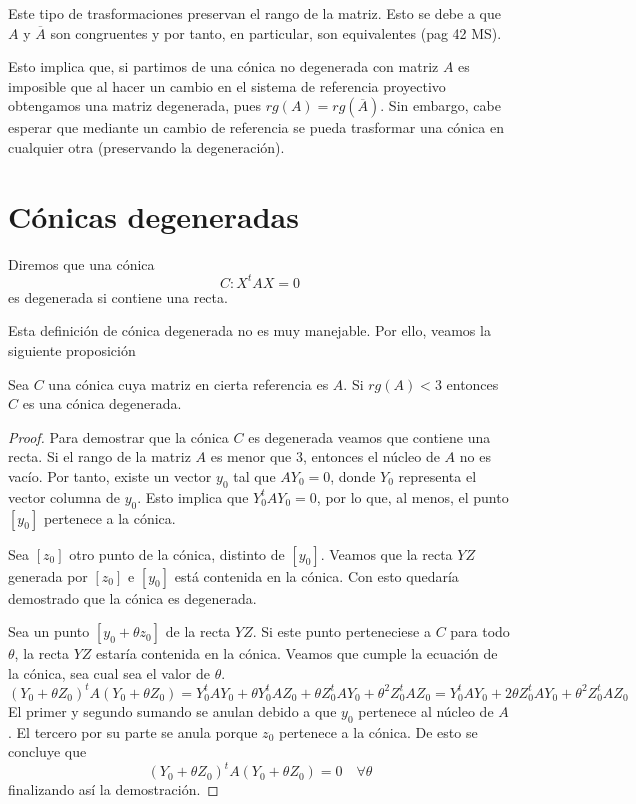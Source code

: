 Este tipo de trasformaciones preservan el rango de la matriz. Esto se debe a que $A$ y $\overline{A}$ son congruentes y por tanto, en particular, son equivalentes (pag 42 MS).

Esto implica que, si partimos de una cónica no degenerada con matriz $A$ es imposible que al hacer un cambio en el sistema de referencia proyectivo obtengamos una matriz degenerada, pues $rg(A)=rg(\overline{A})$. Sin embargo, cabe esperar que mediante un cambio de referencia se pueda trasformar una cónica en cualquier otra (preservando la degeneración).

\section{Cónicas degeneradas}
\begin{defi}
	Diremos que una cónica
	\begin{equation}
	C:X^tAX=0
	\end{equation}
	es degenerada si contiene una recta.
\end{defi}

Esta definición de cónica degenerada no es muy manejable. Por ello, veamos la siguiente proposición
\begin{prop}
	 Sea $C$ una cónica cuya matriz en cierta referencia es $A$. Si $rg(A)<3$ entonces $C$ es una cónica degenerada.
\end{prop}

\begin{proof}
	 Para demostrar que la cónica $C$ es degenerada veamos que contiene una recta. Si el rango de la matriz $A$ es menor que $3$, entonces el núcleo de $A$ no es vacío. Por tanto, existe un vector $y_0$ tal que $AY_0=0$, donde $Y_0$ representa el vector columna de $y_0$. Esto implica que $Y_0^tAY_0=0$, por lo que, al menos, el punto $[y_0]$ pertenece a la cónica.
	 
	 Sea $[z_0]$ otro punto de la cónica, distinto de $[y_0]$. Veamos que la recta $YZ$ generada por $[z_0]$ e $[y_0]$ está contenida en la cónica. Con esto quedaría demostrado que la cónica es degenerada.
	 
	 Sea un punto $[y_0+\theta z_0]$ de la recta $YZ$. Si este punto perteneciese a $C$ para todo $\theta$, la recta $YZ$ estaría contenida en la cónica. Veamos que cumple la ecuación de la cónica, sea cual sea el valor de $\theta$.
	 \begin{equation}\label{C8:eq_joanch_conicas_deg}
	 (Y_0+\theta Z_0)^tA(Y_0+\theta Z_0)=Y_0^tAY_0+\theta Y_0^tAZ_0+\theta Z_0^tAY_0+\theta^2Z_0^tAZ_0=Y_0^tAY_0+2\theta Z_0^tAY_0+\theta^2Z_0^tAZ_0
	 \end{equation}
	 El primer y segundo sumando se anulan debido a que $y_0$ pertenece al núcleo de $A$. El tercero por su parte se anula porque $z_0$ pertenece a la cónica. De esto se concluye que
	 \begin{equation}
	 (Y_0+\theta Z_0)^tA(Y_0+\theta Z_0)=0 \quad \forall\theta
	 \end{equation}
	 finalizando así la demostración.
\end{proof}

